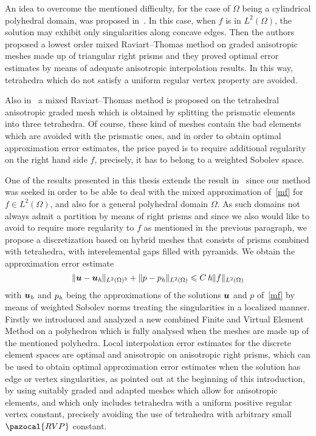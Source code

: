 \tetsTikz

An idea to overcome the mentioned difficulty, for the case of $\Omega$ being a 
cylindrical polyhedral domain, 
was proposed in~\cite{MR1866274}. In  this case, when $f$ is in $L^2(\Omega)$, 
the solution may exhibit only singularities along concave edges.
Then the authors proposed a lowest order mixed Raviart--Thomas method on graded 
anisotropic meshes made up of triangular right prisms and they proved optimal error 
estimates by means of adequate anisotropic interpolation results. 
In this way, tetrahedra which do not satisfy a
uniform regular vertex property are avoided.

Also in~\cite{MR1866274} a mixed Raviart--Thomas method is 
proposed on the tetrahedral 
anisotropic graded mesh which is obtained by splitting the prismatic elements 
into three tetrahedra. Of course, these kind of meshes contain the bad elements 
which are avoided with the prismatic ones, and in order to obtain optimal 
approximation error estimates, the price payed is to require additional regularity 
on the right hand side $f$, precisely, it has to belong to a weighted Sobolev space.

One of the results presented in this thesis extends
the result in~\cite{MR1866274} since our method was seeked in order to be able 
to deal with the mixed approximation of~\eqref{mf} for $f\in L^2(\Omega)$,
and also for a general polyhedral domain $\Omega$. As such domains not always 
admit a partition by means of right prisms and since 
we also would like to avoid to require more regularity to $f$ as mentioned in 
the previous paragraph, we propose a 
discretization based on hybrid meshes that consists of prisms combined with 
tetrahedra, with 
interelemental gaps filled with pyramids. We obtain 
the approximation error estimate
\begin{equation}\label{auxlabel401}
 \|\boldsymbol{u}-\boldsymbol{u}_{\textit h}\|_{L^2(\Omega)^3} + \|p-p_{\textit h}\|_{L^2(\Omega)} 
 \leqslant C\,\textit{h}\|f\|_{L^2(\Omega)}
\end{equation}
with $\boldsymbol{u}_{\textit h}$ and $p_{\textit h}$ being the approximations of the 
solutions $\boldsymbol{u}$ and $p$ of~\eqref{mf} by means of weighted Sobolev norms
treating the singularities in a localized manner. 
Firstly we introduced and analyzed a new 
combined Finite and Virtual 
Element Method on a polyhedron which is fully analysed when the meshes are made 
up of the mentioned polyhedra. Local 
interpolation error estimates for the discrete element spaces are 
optimal and anisotropic on anisotropic right prisms, which can be
used to obtain optimal approximation error estimates when the 
solution has edge or vertex singularities, as pointed out at the beginning of 
this introduction, by using suitably graded and adapted meshes which 
allow for anisotropic elements, and which only includes tetrahedra with a
uniform positive regular vertex constant, precisely avoiding the use of tetrahedra
with arbitrary small $\pazocal{RVP}$ constant.

